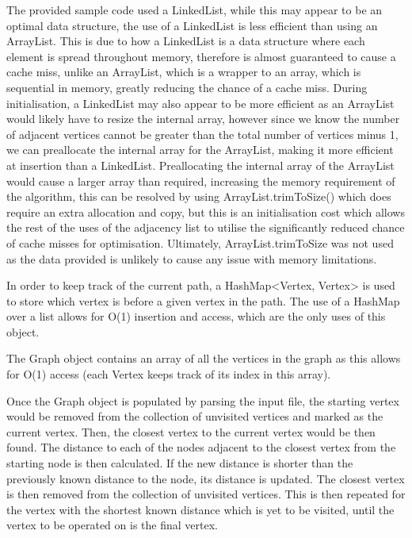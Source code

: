 \documentclass{article}
\begin{document}
    The provided sample code used a LinkedList, while this may appear to be an optimal data structure, the use of a 
    LinkedList is less efficient than using an ArrayList.
    This is due to how a LinkedList is a data structure where each element is spread throughout memory, therefore is 
    almost guaranteed to cause a cache miss, unlike an ArrayList, which is a wrapper to an array, which is sequential in
    memory, greatly reducing the chance of a cache miss.
    During initialisation, a LinkedList may also appear to be more efficient as an ArrayList would likely have to resize
    the internal array, however since we know the number of adjacent vertices cannot be greater than the total number of
    vertices minus 1, we can preallocate the internal array for the ArrayList, making it more efficient at insertion
    than a LinkedList.
    Preallocating the internal array of the ArrayList would cause a larger array than required,
    increasing the memory requirement of the algorithm, this can be resolved by using ArrayList.trimToSize() which does
    require an extra allocation and copy, but this is an initialisation cost which allows the rest of the uses of the
    adjacency list to utilise the significantly reduced chance of cache misses for optimisation.
    Ultimately, ArrayList.trimToSize was not used as the data provided is unlikely to cause any issue with memory
    limitations.

    In order to keep track of the current path, a HashMap<Vertex, Vertex> is used to store which vertex is before a given
    vertex in the path.
    The use of a HashMap over a list allows for O(1) insertion and access, which are the only uses of this object.

    The Graph object contains an array of all the vertices in the graph as this allows for O(1) access (each Vertex keeps
    track of its index in this array).

    Once the Graph object is populated by parsing the input file, the starting vertex would be removed from the collection
    of unvisited vertices and marked as the current vertex.
    Then, the closest vertex to the current vertex would be then found.
    The distance to each of the nodes adjacent to the closest vertex from the starting node is then calculated.
    If the new distance is shorter than the previously known distance to the node, its distance is updated.
    The closest vertex is then removed from the collection of unvisited vertices.
    This is then repeated for the vertex with the shortest known distance which is yet to be visited, until the vertex to be
    operated on is the final vertex.
\end{document}
